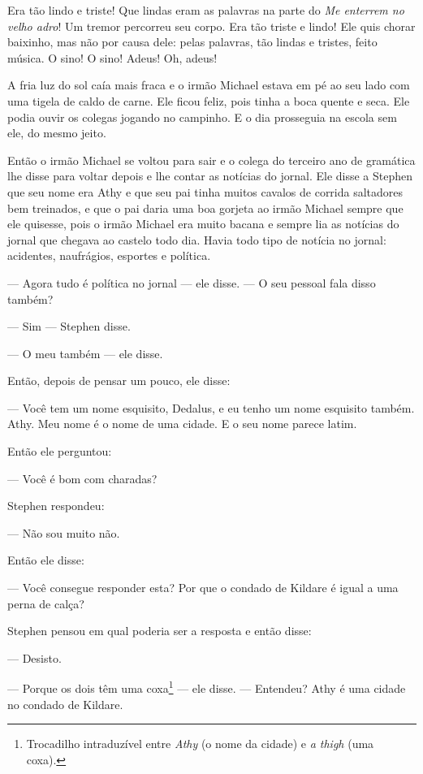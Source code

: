 Era tão lindo e triste! Que lindas eram as palavras na parte do
\textit{Me enterrem no velho adro}! Um tremor percorreu seu corpo. Era
tão triste e lindo! Ele quis chorar baixinho, mas não por causa dele:
pelas palavras, tão lindas e tristes, feito música. O sino! O sino!
Adeus! Oh, adeus!

A fria luz do sol caía mais fraca e o irmão Michael estava em pé ao seu
lado com uma tigela de caldo de carne. Ele ficou feliz, pois tinha a
boca quente e seca. Ele podia ouvir os colegas jogando no campinho.  E
o dia prosseguia na escola sem ele, do mesmo jeito.

Então o irmão Michael se voltou para sair e o colega do terceiro ano de
gramática lhe disse para voltar depois e lhe contar as notícias do
jornal. Ele disse a Stephen que seu nome era Athy e que seu pai tinha
muitos cavalos de corrida saltadores bem treinados, e que o pai daria
uma boa gorjeta ao irmão Michael sempre que ele quisesse, pois o irmão
Michael era muito bacana e sempre lia as notícias do jornal que chegava
ao castelo todo dia. Havia todo tipo de notícia no jornal: acidentes,
naufrágios, esportes e política.

 --- Agora tudo é política no jornal --- ele disse. --- O seu pessoal fala disso também?

 --- Sim --- Stephen disse.

 --- O meu também --- ele disse.

Então, depois de pensar um pouco, ele disse:

 --- Você tem um nome esquisito, Dedalus, e eu tenho um nome esquisito
também. Athy. Meu nome é o nome de uma cidade. E o seu nome parece
latim.

Então ele perguntou:

 --- Você é bom com charadas?

Stephen respondeu:

 --- Não sou muito não.

Então ele disse:

 --- Você consegue responder esta?  Por que o condado de Kildare é igual a
uma perna de calça?

Stephen pensou em qual poderia ser a resposta e então disse:

 --- Desisto.

 --- Porque os dois têm uma coxa\footnote{ Trocadilho intraduzível entre
\textit{Athy} (o nome da cidade) e \textit{a thigh} (uma coxa).} ---
ele disse. --- Entendeu? Athy é uma cidade no condado de Kildare.

